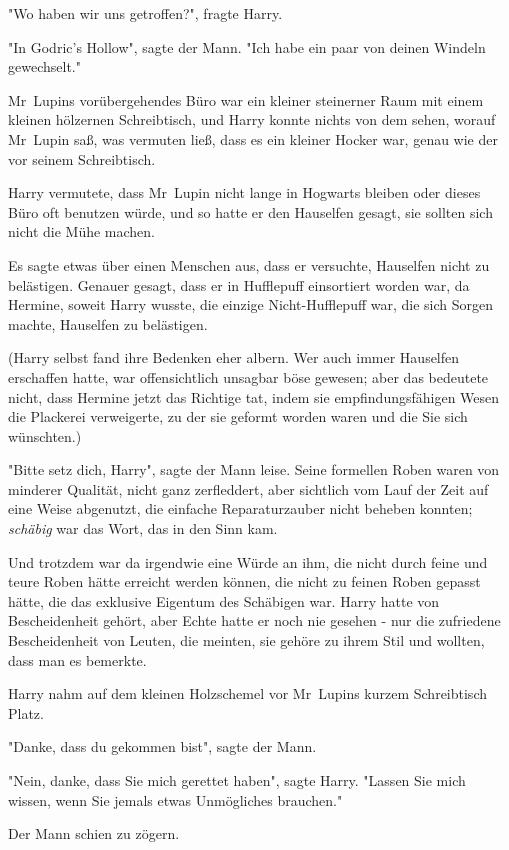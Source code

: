 {"Wo haben wir uns getroffen?", fragte Harry.

"In Godric's Hollow", sagte der Mann. "Ich habe ein paar von deinen Windeln gewechselt."

Mr~Lupins vorübergehendes Büro war ein kleiner steinerner Raum mit einem kleinen hölzernen Schreibtisch, und Harry konnte nichts von dem sehen, worauf Mr~Lupin saß, was vermuten ließ, dass es ein kleiner Hocker war, genau wie der vor seinem Schreibtisch.

Harry vermutete, dass Mr~Lupin nicht lange in Hogwarts bleiben oder dieses Büro oft benutzen würde, und so hatte er den Hauselfen gesagt, sie sollten sich nicht die Mühe machen.

Es sagte etwas über einen Menschen aus, dass er versuchte, Hauselfen nicht zu belästigen. Genauer gesagt, dass er in Hufflepuff einsortiert worden war, da Hermine, soweit Harry wusste, die einzige Nicht-Hufflepuff war, die sich Sorgen machte, Hauselfen zu belästigen.

(Harry selbst fand ihre Bedenken eher albern. Wer auch immer Hauselfen erschaffen hatte, war offensichtlich unsagbar böse gewesen; aber das bedeutete nicht, dass Hermine jetzt das Richtige tat, indem sie empfindungsfähigen Wesen die Plackerei verweigerte, zu der sie geformt worden waren und die Sie sich wünschten.)

"Bitte setz dich, Harry", sagte der Mann leise. Seine formellen Roben waren von minderer Qualität, nicht ganz zerfleddert, aber sichtlich vom Lauf der Zeit auf eine Weise abgenutzt, die einfache Reparaturzauber nicht beheben konnten; \emph{schäbig} war das Wort, das in den Sinn kam.

Und trotzdem war da irgendwie eine Würde an ihm, die nicht durch feine und teure Roben hätte erreicht werden können, die nicht zu feinen Roben gepasst hätte, die das exklusive Eigentum des Schäbigen war. Harry hatte von Bescheidenheit gehört, aber Echte hatte er noch nie gesehen - nur die zufriedene Bescheidenheit von Leuten, die meinten, sie gehöre zu ihrem Stil und wollten, dass man es bemerkte.

Harry nahm auf dem kleinen Holzschemel vor Mr~Lupins kurzem Schreibtisch Platz.

"Danke, dass du gekommen bist", sagte der Mann.

"Nein, danke, dass Sie mich gerettet haben", sagte Harry. "Lassen Sie mich wissen, wenn Sie jemals etwas Unmögliches brauchen."

Der Mann schien zu zögern.

}
